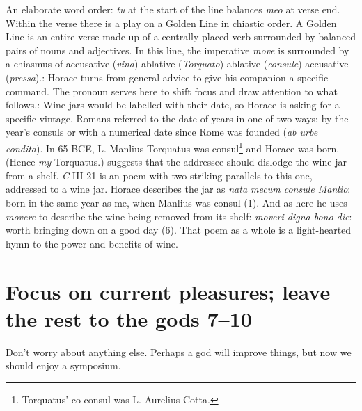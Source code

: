 An elaborate word order: \textit{tu} at the start of the line balances \textit{meo} at verse end. Within the verse there is a play on a Golden Line in chiastic order.  A Golden Line is an entire verse made up of a centrally placed verb surrounded by balanced pairs of nouns and adjectives.  In this line, the imperative \textit{move} is surrounded by a chiasmus of accusative (\textit{vina}) ablative (\textit{Torquato}) ablative (\textit{consule}) accusative (\textit{pressa}).\indent{}: Horace turns from general advice to give his companion a specific command.  The pronoun serves here to shift focus and draw attention to what follows.\indent{}: Wine jars would be labelled with their date, so Horace is asking for a specific vintage.  Romans referred to the date of years in one of two ways: by the year's consuls or with a numerical date since Rome was founded (\textit{ab urbe condita}).  In 65 BCE, L. Manlius Torquatus was consul\footnote{Torquatus' co-consul was L. Aurelius Cotta.} and Horace was born.  (Hence \textit{my} Torquatus.)\indent{} suggests that the addressee should dislodge the wine jar from a shelf.  \textit{C} III 21 is an poem with two striking parallels to this one, addressed to a wine jar.  Horace describes the jar as \textit{nata mecum consule Manlio}: born in the same year as me, when Manlius was consul (1).  And as here he uses \textit{movere} to describe the wine being removed from its shelf: \textit{moveri digna bono die}: worth bringing down on a good day (6).  That poem as a whole is a light-hearted hymn to the power and benefits of wine.


\section*{Focus on current pleasures; leave the rest to the gods 7--10}

Don't worry about anything else. Perhaps a god will improve things, but now we should enjoy a symposium.


